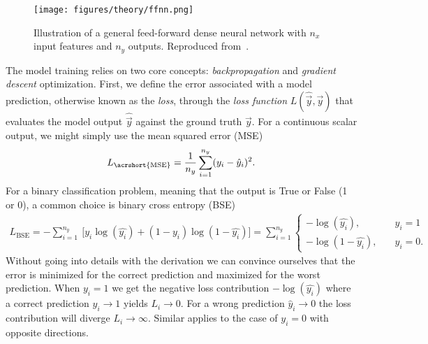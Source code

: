 \begin{figure}[!htb]
  \centering
  \texttt{[image: figures/theory/ffnn.png]}
  \caption{Illustration of a general feed-forward dense neural network with $n_x$ input features and $n_y$ outputs. Reproduced from~\cite{IN5400_slides}.}
  \label{fig:ffnn}
\end{figure}

The model training relies on two core concepts: \textit{backpropagation} and \textit{gradient descent} optimization. First, we define the error associated with a model prediction, otherwise known as the \textit{loss}, through the \textit{loss function} $L(\hat{\vec{y}}, \vec{y})$ that evaluates the model output $\hat{\vec{y}}$ against the ground truth $\vec{y}$. For a continuous scalar output, we might simply use the mean squared error (\acrshort{MSE})
\begin{align}
  L_{\text{\acrshort{MSE}}} = \frac{1}{n_y} \sum_{i = 1}^{n_y} (y_i - \hat{y}_i)^2.
  \label{eq:MSE}
\end{align}
For a binary classification problem, meaning that the output is True or False (1 or 0), a common choice is binary cross entropy (BSE)
\begin{align}
  L_{\text{BSE}} =  -\sum_{i=1}^{n_y} \ \Big[y_i\log(\hat{y_i}) + (1-y_i)\log(1 - \hat{y_i}) \Big] =  \sum_{i=1}^{n_y}   \begin{cases}
    - \log{(\hat{y_i})},& \quad y_i = 1 \\
    -\log{(1-\hat{y_i})},& \quad y_i = 0.
  \label{eq:BSE}
\end{cases}
\end{align}
Without going into details with the derivation we can convince ourselves that the error is minimized for the correct prediction and maximized for the worst prediction. When $y_i = 1$ we get the negative loss contribution $-\log(\hat{y_i})$ where a correct prediction $\hat{y}_i \to 1$ yields $L_i \to 0$. For a wrong prediction $\hat{y}_i \to 0$ the loss contribution will diverge $L_i \to \infty$. Similar applies to the case of $y_i = 0$ with opposite directions. 

